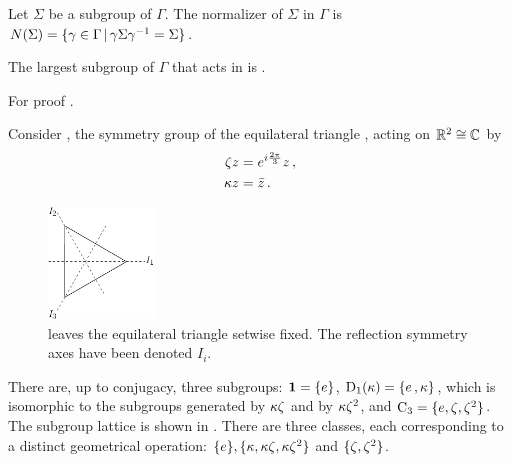 \begin{definition}
 Let $\Sigma$ be a subgroup of $\Gamma$. The normalizer of $\Sigma$ in $\Gamma$ is
 $N(\Sigma)=\{\gamma\in\Gamma\, |\, \gamma\Sigma\gamma^{-1}=\Sigma\}$.
\end{definition}

\begin{lemma}
  The largest subgroup of $\Gamma$ that acts in \Fix{\Sigma} is \Nlz{\Sigma}.
  \label{lem:NlzActs}
\end{lemma}
For proof \cf {}.



\begin{example} %
Consider , the symmetry group of the equilateral triangle
, acting on $\mathbb{R}^{2}\cong\mathbb{C}^{}$ by
\begin{subequations}\label{eq:D3onR2}
\begin{align}	
  \zeta z &= e^{i\frac{2\pi}{3}} z\,,\\
  \kappa z  &= \bar{z}\,.
 \end{align}
\end{subequations}

\begin{figure}
\begin{center}
		\includegraphics[width=0.25\textwidth]{../figs/D3triangle}
\end{center}
\caption[ symmetry]{
    {\small
     leaves the equilateral triangle setwise fixed.
    The reflection symmetry axes have been denoted $I_i$.}}
\label{fig:D3triangle}
    \vspace*{-5pt}
\end{figure}

There are, up to conjugacy, three subgroups: $\mathbf{1}=\{e\}$, $\mathrm{D}_1(\kappa)=\{e\,,\kappa\}$,
which is isomorphic to the subgroups generated
by $\kappa\zeta$ and by $\kappa\zeta^2$, and $\mathrm{C}_{3}=\{e,\zeta,\zeta^2\}$.
The subgroup lattice is shown in .
There are three classes, each corresponding to
a distinct geometrical operation: $\{e\},\{\kappa,\kappa\zeta,\kappa\zeta^2\}$
and $\{\zeta,\zeta^2\}$.


\end{example}



